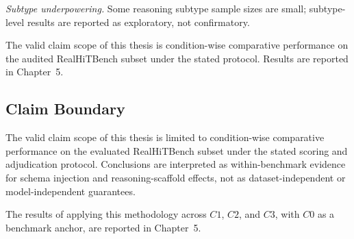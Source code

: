 ﻿\documentclass[a4paper]{article}
\begin{document}
\textit{Subtype underpowering.} Some reasoning subtype sample 
sizes are small; subtype-level results are reported as 
exploratory, not confirmatory.

The valid claim scope of this thesis is condition-wise 
comparative performance on the audited RealHiTBench subset under 
the stated protocol. Results are reported in Chapter~5.

\subsection{Claim Boundary}

The valid claim scope of this thesis is limited to condition-wise comparative performance on the evaluated RealHiTBench subset under the stated scoring and adjudication protocol. Conclusions are interpreted as within-benchmark evidence for schema injection and reasoning-scaffold effects, not as dataset-independent or model-independent guarantees.

The results of applying this methodology across \(C1\), \(C2\), and \(C3\), with \(C0\) as a benchmark anchor, are reported in Chapter~5.
\end{document}
